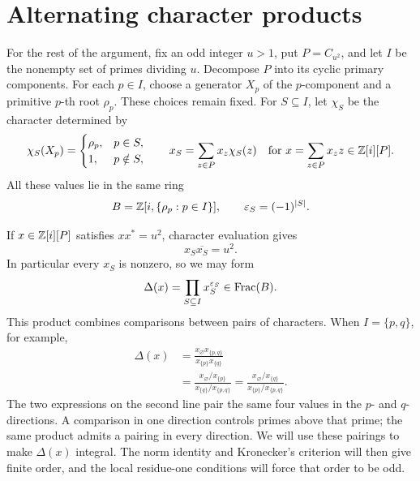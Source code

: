 \section{Alternating character products}\label{sec:products}

For the rest of the argument, fix an odd integer \(u>1\), put
\(P=C_{u^2}\), and let \(I\) be the nonempty set of primes dividing
\(u\). Decompose \(P\) into its cyclic primary components. For each
\(p\in I\), choose a generator \(X_p\) of the \(p\)-component and a
primitive \(p\)-th root \(\rho_p\). These choices remain fixed.
For \(S\subseteq I\), let \(\chi_S\) be the character determined by
\[
 \chi_S(X_p)=
 \begin{cases}
  \rho_p,&p\in S,\\
  1,&p\notin S,
 \end{cases}
 \qquad
 x_S=\sum_{z\in P}x_z\chi_S(z)
 \quad\text{for }x=\sum_{z\in P}x_z z\in\mathbb Z[i][P].
\]
All these values lie in the same ring
\begin{equation}\label{eq:alternating-notation}
 B=\mathbb Z[i,\{\rho_p:p\in I\}],\qquad
 \varepsilon_S=(-1)^{|S|}.
\end{equation}

If \(x\in\mathbb Z[i][P]\) satisfies \(xx^*=u^2\), character evaluation gives
\begin{equation}\label{eq:character-norm}
 x_S\overline{x_S}=u^2.
\end{equation}
In particular every \(x_S\) is nonzero, so we may form
\begin{equation}\label{eq:delta}
 \Delta(x)=\prod_{S\subseteq I}x_S^{\varepsilon_S}\in\operatorname{Frac}(B).
\end{equation}
This product combines comparisons between pairs of characters. When
\(I=\{p,q\}\), for example,
\[
 \begin{aligned}
 \Delta(x)
  &=\frac{x_{\varnothing}x_{\{p,q\}}}
          {x_{\{p\}}x_{\{q\}}}\\
  &=\frac{x_{\varnothing}/x_{\{p\}}}
          {x_{\{q\}}/x_{\{p,q\}}}
   =\frac{x_{\varnothing}/x_{\{q\}}}
          {x_{\{p\}}/x_{\{p,q\}}}.
 \end{aligned}
\]
The two expressions on the second line pair the same four values in
the \(p\)- and \(q\)-directions. A comparison in one direction controls
primes above that prime; the same product admits a pairing in every
direction. We will use these pairings to make \(\Delta(x)\) integral.
The norm identity and Kronecker's criterion will then give finite order,
and the local residue-one conditions will force that order to be odd.

